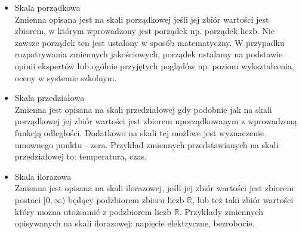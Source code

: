 \documentclass[12pt,a4paper]{report}
\begin{document}
\begin{itemize}


\item Skala porządkowa \cite[Rozdział 1.2]{panek2013}\\
Zmienna opisana jest na skali porządkowej jeśli jej zbiór wartości jest zbiorem, w którym wprowadzony jest porządek np. porządek liczb. Nie zawsze porządek ten jest ustalony w sposób matematyczny. W przypadku rozpatrywania zmiennych jakościowych, porządek ustalamy na podstawie opinii ekspertów lub ogólnie przyjętych poglądów np. poziom wykształcenia, oceny w systemie szkolnym. 


\item Skala przedziałowa \cite[Rozdział 1.2]{panek2013}\\
Zmienna jest opisana na skali przedziałowej gdy podobnie jak na skali porządkowej jej zbiór wartości jest zbiorem uporządkowanym z wprowadzoną funkcją odległości. Dodatkowo na skali tej możliwe jest wyznaczenie umownego punktu - zera. Przykład zmiennych przedstawianych na skali przedziałowej to: temperatura, czas.


\item Skala ilorazowa \cite[Rozdział 1.2]{panek2013}\\
Zmienna jest opisana na skali ilorazowej, jeśli jej zbiór wartości jest zbiorem postaci $[0, \infty)$ będący podzbiorem zbioru liczb $\mathbb{R}$, lub też taki zbiór wartości który można utożsamić z podzbiorem liczb $\mathbb{R}$. Przykłady zmiennych opisywanych na skali ilorazowej: napięcie elektryczne, bezrobocie. 


\end{itemize}
\end{document}
